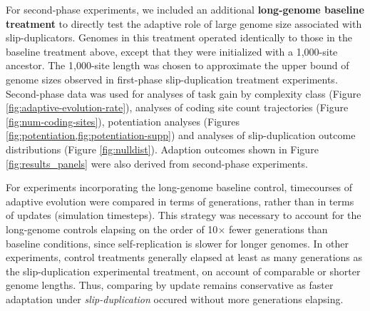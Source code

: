 For second-phase experiments, we included an additional \textbf{long-genome baseline treatment} to directly test the adaptive role of large genome size associated with slip-duplicators.
Genomes in this treatment operated identically to those in the baseline treatment above, except that they were initialized with a 1,000-site ancestor.
The 1,000-site length was chosen to approximate the upper bound of genome sizes observed in first-phase slip-duplication treatment experiments.
Second-phase data was used for analyses of task gain by complexity class (Figure \ref{fig:adaptive-evolution-rate}), analyses of coding site count trajectories (Figure \ref{fig:num-coding-sites}), potentiation analyses (Figures \cref{fig:potentiation,fig:potentiation-supp}) and analyses of slip-duplication outcome distributions (Figure \ref{fig:nulldist}).
Adaption outcomes shown in Figure \ref{fig:results_panels} were also derived from second-phase experiments.

For experiments incorporating the long-genome baseline control, timecourses of adaptive evolution were compared in terms of generations, rather than in terms of updates (simulation timesteps).
This strategy was necessary to account for the long-genome controls elapsing on the order of 10$\times$ fewer generations than baseline conditions, since self-replication is slower for longer genomes.
In other experiments, control treatments generally elapsed at least as many generations as the slip-duplication experimental treatment, on account of comparable or shorter genome lengths.
Thus, comparing by update remains conservative as faster adaptation under \textit{slip-duplication} occured without more generations elapsing.


